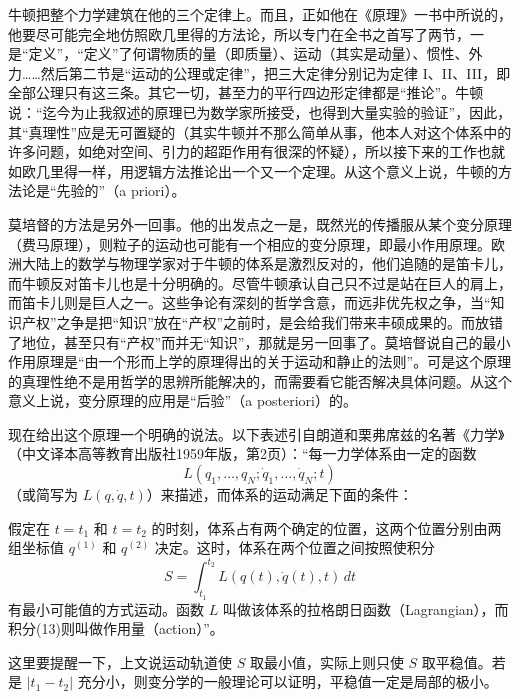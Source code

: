 牛顿把整个力学建筑在他的三个定律上。而且，正如他在《原理》一书中所说的，他要尽可能完全地仿照欧几里得的方法论，所以专门在全书之首写了两节，一是“定义”，“定义”了何谓物质的量（即质量）、运动（其实是动量）、惯性、外力……然后第二节是“运动的公理或定律”，把三大定律分别记为定律 I、II、III，即全部公理只有这三条。其它一切，甚至力的平行四边形定律都是“推论”。牛顿说：“迄今为止我叙述的原理已为数学家所接受，也得到大量实验的验证”，因此，其“真理性”应是无可置疑的（其实牛顿并不那么简单从事，他本人对这个体系中的许多问题，如绝对空间、引力的超距作用有很深的怀疑），所以接下来的工作也就如欧几里得一样，用逻辑方法推论出一个又一个定理。从这个意义上说，牛顿的方法论是“先验的”（a priori）。

莫培督的方法是另外一回事。他的出发点之一是，既然光的传播服从某个变分原理（费马原理），则粒子的运动也可能有一个相应的变分原理，即最小作用原理。欧洲大陆上的数学与物理学家对于牛顿的体系是激烈反对的，他们追随的是笛卡儿，而牛顿反对笛卡儿也是十分明确的。尽管牛顿承认自己只不过是站在巨人的肩上，而笛卡儿则是巨人之一。这些争论有深刻的哲学含意，而远非优先权之争，当“知识产权”之争是把“知识”放在“产权”之前时，是会给我们带来丰硕成果的。而放错了地位，甚至只有“产权”而并无“知识”，那就是另一回事了。莫培督说自己的最小作用原理是“由一个形而上学的原理得出的关于运动和静止的法则”。可是这个原理的真理性绝不是用哲学的思辨所能解决的，而需要看它能否解决具体问题。从这个意义上说，变分原理的应用是“后验”（a posteriori）的。

现在给出这个原理一个明确的说法。以下表述引自朗道和栗弗席兹的名著《力学》（中文译本高等教育出版社1959年版，第2页）：“每一力学体系由一定的函数
\begin{equation}
 L(q_1,\ldots,q_N;\dot q_1,\ldots,\dot q_N;t)
 \tag{12}
\end{equation}
（或简写为 $L(q,\dot q,t)$）来描述，而体系的运动满足下面的条件：

假定在 $t=t_1$ 和 $t=t_2$ 的时刻，体系占有两个确定的位置，这两个位置分别由两组坐标值 $q^{(1)}$ 和 $q^{(2)}$ 决定。这时，体系在两个位置之间按照使积分
\begin{equation}
 S=\int_{t_1}^{t_2}L(q(t),\dot q(t),t)\,dt
 \tag{13}
\end{equation}
有最小可能值的方式运动。函数 $L$ 叫做该体系的拉格朗日函数（Lagrangian），而积分(13)则叫做作用量（action）”。

这里要提醒一下，上文说运动轨道使 $S$ 取最小值，实际上则只使 $S$ 取平稳值。若是 $|t_1-t_2|$ 充分小，则变分学的一般理论可以证明，平稳值一定是局部的极小。

